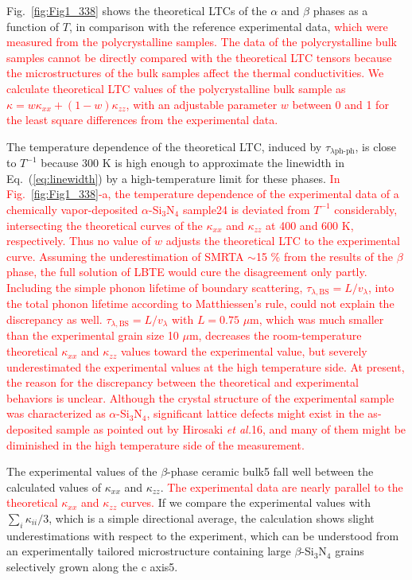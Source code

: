 \documentclass[twocolumn,amsmath,amssymb,a4paper,prb,superscriptaddress,floatfix]{revtex4-1}
\begin{document}
Fig.~\ref{fig:Fig1_338} shows the theoretical LTCs of the $\alpha$ and
$\beta$ phases as a function of $T$, in comparison with the reference
experimental data,
%
\textcolor{red}{which were measured from the polycrystalline
samples. The data of the polycrystalline bulk samples cannot be directly
compared with the theoretical LTC tensors because the microstructures of
the bulk samples affect the thermal conductivities. We calculate
theoretical LTC values of the polycrystalline bulk sample as $\kappa = w
\kappa_{xx} + (1-w) \kappa_{zz}$, with an adjustable parameter $w$
between 0 and 1 for the least square differences from the experimental
data.}

The temperature dependence of the theoretical LTC, induced by
$\tau_{\lambda\text{ph-ph}}$, is close to $T^{-1}$ because 300 K is high
enough to approximate the linewidth in Eq.~(\ref{eq:linewidth}) by a
high-temperature limit for these phases.
%
\textcolor{red}{In Fig.~\ref{fig:Fig1_338}-a, the temperature dependence
of the experimental data of a chemically vapor-deposited
$\alpha$-Si$_3$N$_4$ sample24 is deviated from $T^{-1}$ considerably,
intersecting the theoretical curves of the $\kappa$$_{xx}$ and
$\kappa$$_{zz}$ at 400 and 600 K, respectively. Thus no value of $w$
adjusts the theoretical LTC to the experimental curve. Assuming the
underestimation of SMRTA $\sim$15 \% from the results of the $\beta$
phase, the full solution of LBTE would cure the disagreement only
partly. Including the simple phonon lifetime of boundary scattering,
$\tau_{\lambda,\text{BS}} =L/v_\lambda$, into the total phonon lifetime
according to Matthiessen's rule, could not explain the discrepancy as
well. $\tau_{\lambda,\text{BS}} =L/v_\lambda$ with $L = 0.75$
$\mu\text{m}$, which was much smaller than the experimental grain size
10 $\mu\text{m}$, decreases the room-temperature theoretical $\kappa$$_{xx}$ and
$\kappa$$_{zz}$ values toward the experimental value, but severely
underestimated the experimental values at the high temperature side. At
present, the reason for the discrepancy between the theoretical and
experimental behaviors is unclear. Although the crystal structure of the
experimental sample was characterized as $\alpha$-Si$_3$N$_4$,
significant lattice defects might exist in the as-deposited sample as
pointed out by Hirosaki {\it et al.}16, and many of them might be
diminished in the high temperature side of the measurement.}

The experimental values of the $\beta$-phase ceramic bulk5 fall well
between the calculated values of $\kappa$$_{xx}$ and $\kappa$$_{zz}$.
%
\textcolor{red}{The experimental data are nearly parallel to the
theoretical $\kappa$$_{xx}$ and $\kappa$$_{zz}$ curves.}
%
If we compare the experimental values with $\sum_i \kappa_{ii}/3$, which is
a simple directional average, the calculation shows slight
underestimations with respect to the experiment, which can be understood
from an experimentally tailored microstructure containing large
$\beta$-Si$_3$N$_4$ grains selectively grown along the c axis5.
\end{document}
